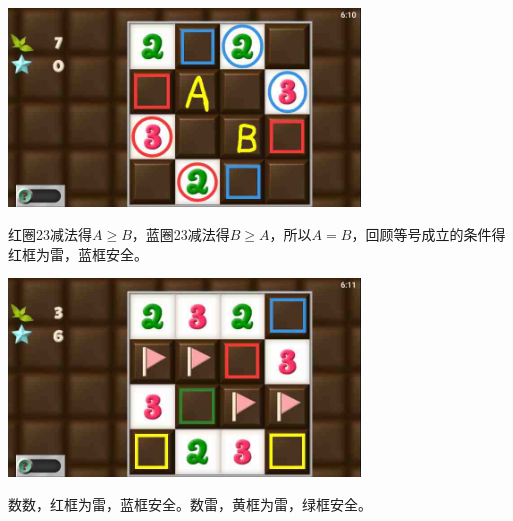 \subsection{} %
\begin{center}
    \includegraphics[width=0.7\textwidth]{puzzlelow/103-1.jpg}
\end{center}
红圈23减法得$A\ge B$，蓝圈23减法得$B\ge A$，所以$A=B$，回顾等号成立的条件得红框为雷，蓝框安全。
\begin{center}
    \includegraphics[width=0.7\textwidth]{puzzlelow/103-2.jpg}
\end{center}
数数，红框为雷，蓝框安全。数雷，黄框为雷，绿框安全。

